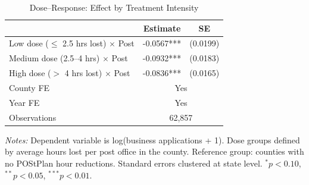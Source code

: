 \begin{table}[htbp]
\centering
\caption{Dose--Response: Effect by Treatment Intensity}
\label{tab:dose}
\begin{tabular}{lcc}
\hline\hline
 & Estimate & SE \\
\hline
Low dose ($\leq$ 2.5 hrs lost) $\times$ Post & -0.0567*** & (0.0199) \\
Medium dose (2.5--4 hrs) $\times$ Post & -0.0932*** & (0.0183) \\
High dose ($>$ 4 hrs lost) $\times$ Post & -0.0836*** & (0.0165) \\
\hline
County FE & \multicolumn{2}{c}{Yes} \\
Year FE & \multicolumn{2}{c}{Yes} \\
Observations & \multicolumn{2}{c}{62,857} \\
\hline\hline
\end{tabular}
\begin{tablenotes}[flushleft]\small
\item \textit{Notes:} Dependent variable is log(business applications + 1). Dose groups defined by average hours lost per post office in the county. Reference group: counties with no POStPlan hour reductions. Standard errors clustered at state level. $^{*}p<0.10$, $^{**}p<0.05$, $^{***}p<0.01$.
\end{tablenotes}
\end{table}
